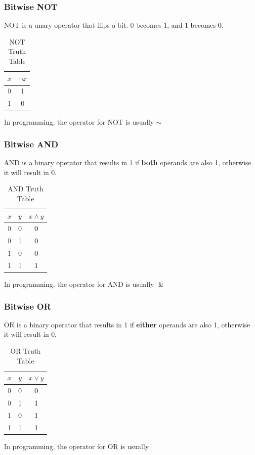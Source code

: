 \documentclass{article}
\begin{document}
\subsubsection{Bitwise NOT} \label{Bitwise NOT}
NOT is a unary operator that flips a bit. 0 becomes 1, and 1 becomes 0.
\begin{table}[h]
    \centering
    \caption{NOT Truth Table}
    \begin{tabular}{c|c}
        \(x\) & \(\neg x\) \\ \hline
        0     & 1          \\
        1     & 0          \\
    \end{tabular}
\end{table}
\begin{tcolorbox}[title=Note]
    In programming, the operator for NOT is usually \(\sim\)
\end{tcolorbox}
%
\subsubsection{Bitwise AND} \label{Bitwise AND}
AND is a binary operator that results in 1 if \textbf{both} operands are also 1,
otherwise it will result in 0.
\begin{table}[h]
    \centering
    \caption{AND Truth Table}
    \begin{tabular}{c|c|c}
        \(x\) & \(y\) & \(x \wedge y\) \\ \hline
        0     & 0     & 0              \\
        0     & 1     & 0              \\
        1     & 0     & 0              \\
        1     & 1     & 1              \\
    \end{tabular}
\end{table}
\begin{tcolorbox}[title=Note]
    In programming, the operator for AND is usually \(\And\)
\end{tcolorbox}
%
\newpage
\subsubsection{Bitwise OR} \label{Bitwise OR}
OR is a binary operator that results in 1 if \textbf{either} operands are also 1,
otherwise it will result in 0.
\begin{table}[h]
    \centering
    \caption{OR Truth Table}
    \begin{tabular}{c|c|c}
        \(x\) & \(y\) & \(x \vee y\) \\ \hline
        0     & 0     & 0            \\
        0     & 1     & 1            \\
        1     & 0     & 1            \\
        1     & 1     & 1            \\
    \end{tabular}
\end{table}
\begin{tcolorbox}[title=Note]
    In programming, the operator for OR is usually \(\vert\)
\end{tcolorbox}
%
\end{document}
